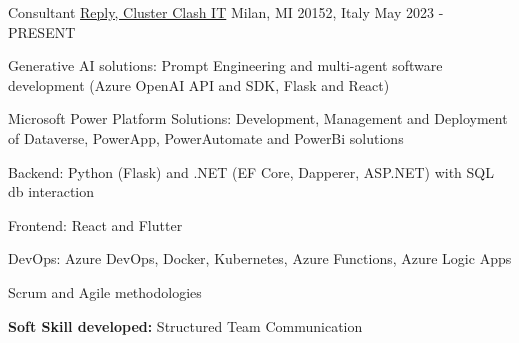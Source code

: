 

\begin{cventries}

  \cventry
    {Consultant} %
    {\href{www.reply.com/}{Reply, Cluster Clash IT}} %
    {Milan, MI 20152, Italy} %
    {May 2023 - PRESENT} %
    {
       \begin{cvitems} %
        \item {Generative AI solutions: Prompt Engineering and multi-agent software development (Azure OpenAI API and SDK, Flask and React)}
        \item {Microsoft Power Platform Solutions: Development, Management and Deployment of Dataverse, PowerApp, PowerAutomate and PowerBi solutions}
        \item {Backend: Python (Flask) and .NET (EF Core, Dapperer, ASP.NET) with SQL db interaction}
        \item {Frontend: React and Flutter}
        \item {DevOps: Azure DevOps, Docker, Kubernetes, Azure Functions, Azure Logic Apps}
        \item {Scrum and Agile methodologies}
        \item {\textbf{Soft Skill developed:} Structured Team Communication}
       \end{cvitems}
    }


\end{cventries}
